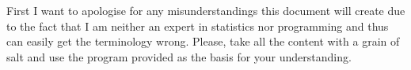 \documentclass{article}
\begin{document}
First I want to apologise for any misunderstandings this document will create
due to the fact that I am neither an expert in statistics nor programming and thus can easily get the terminology wrong.
Please, take all the content with a grain of salt and use the program provided as the basis for your understanding.




\end{document}
